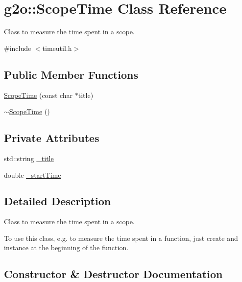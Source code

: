 \hypertarget{classg2o_1_1_scope_time}{}\section{g2o\+:\+:Scope\+Time Class Reference}
\label{classg2o_1_1_scope_time}


Class to measure the time spent in a scope.  




{\ttfamily \#include $<$timeutil.\+h$>$}

\subsection*{Public Member Functions}
\begin{DoxyCompactItemize}
\item 
\mbox{\hyperlink{classg2o_1_1_scope_time_ae9178f069977b767d21e314aab0c3bf2}{Scope\+Time}} (const char $\ast$title)
\item 
\mbox{\hyperlink{classg2o_1_1_scope_time_afec269ec984e05313a28dda5eed02abc}{$\sim$\+Scope\+Time}} ()
\end{DoxyCompactItemize}
\subsection*{Private Attributes}
\begin{DoxyCompactItemize}
\item 
std\+::string \mbox{\hyperlink{classg2o_1_1_scope_time_a6ee3cc8fa420b9963ad5198212c4a8b9}{\+\_\+title}}
\item 
double \mbox{\hyperlink{classg2o_1_1_scope_time_ac9bcaa9a2dfbe09b98de1e7dd664433f}{\+\_\+start\+Time}}
\end{DoxyCompactItemize}


\subsection{Detailed Description}
Class to measure the time spent in a scope. 

To use this class, e.\+g. to measure the time spent in a function, just create and instance at the beginning of the function. 

\subsection{Constructor \& Destructor Documentation}
\mbox{\label{classg2o_1_1_scope_time_ae9178f069977b767d21e314aab0c3bf2}} 
